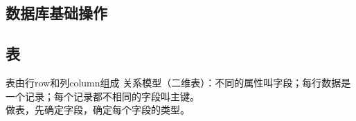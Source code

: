 \documentclass[UTF8]{article}
\begin{document}
\subsection{数据库基础操作}
\begin{comment}
    创建的root密码是123456
    登录：cmd:mysql -h主机名空格-u用户名空格-p密码
    cmd mysql -uroot -p回车
    mysql -hlocalhost -uroot -p -P3306
    登录同时打开数据库：
    mysql -uroot -p -D 数据库名字

    修改密码：mysqladmin -uroot -p旧密码 password 新密码\\
    
    
    退出： exit
    quit
    \q
    ctrl+c
    
    修改命令提示符的名称：如修改为shepherd,每次关闭mysql后失效
    mysql -uroot -p --prompt='shepherd>'
    mysql -uroot -p --prompt='\h~\a~\d~\D'
    h是host，a是用户名，d是选择的数据库，D是日期

    查询版本号：mysql -V
    mysql --version

    ;和\g 是执行改行命令
    \c 不执行改行
    help，\h或者 ？ 加上关键字可以查找帮助

    支持折行写，单引号不要折行；
    MySQL关键字大写。
    库、表、字段名称要避开关键字，否则需要反引号以区分。


    批命令：
    select user();
    select version();
    select now();
    select current_date();
    select current_time();
    select current_timestamp();
    以上几行保存，在cmd中输入以下：\\
    \. E:\Notes\Notes_Latex\MySQL_study\Codes\t001.sql  



    数据库的基本操作

    DATABASE 和 SCHEMA 一样
    show databases; -- 查看数据库
    create database t001; -- 注意双减号注释，前后都需要空格
    show databases;
    select database(); -- a查看当前选定的库
    use t001; -- 打开数据库
    select database();
    DROP DATABASE IF EXISTS t001; -- c删除库

    CREATE DATABASE IF NOT EXISTS t007 DEFAULT CHARACTER SET 'GBK'; -- 指定编码
    SHOW WARNINGS;
    SHOW CREATE DATABASE t007;
    ALTER DATABASE t007 DEFAULT CHARACTER SET 'UTF8'; -- 修改编码
    SHOW CREATE DATABASE t007;


\end{comment}


\subsection{表}
表由行row和列column组成
关系模型（二维表）：不同的属性叫字段；每行数据是一个记录；每个记录都不相同的字段叫主键。\\
做表，先确定字段，确定每个字段的类型。
\end{document}
